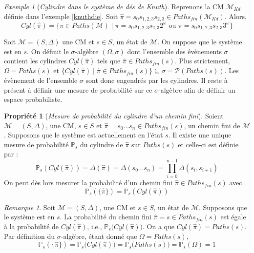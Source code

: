 \documentclass[12pt,a4paper]{report}
\theoremstyle{definition}%
\newtheorem{propriete}{Propriété}[chapter]
\theoremstyle{remark}
\newtheorem{example}{Exemple}[chapter]
\newtheorem{remark}{Remarque}[chapter]
\newcommand{\ie}{i.e., }
\newcommand{\pr}{\mathbb{P}}
\begin{document}
\begin{example}[\textit{Cylindre dans le système de dés de Knuth}]
	Reprenons la CM $\mathcal{M}_{Kd}$ définie dans l'exemple \ref{knuthdie}. Soit $\hat{\pi} = s_0s_{1, 2, 3}s_{2, 3} \in Paths_{fin}(\mathcal{M}_{Kd})$. Alors, \[Cyl(\hat{\pi}) = \{ \pi \in Paths(\mathcal{M}) \; | \; \pi = s_0s_{1, 2, 3}s_{2, 3} 2^\omega \text{ ou } \pi = s_0s_{1, 2, 3}s_{2, 3} 3^\omega \} \]
\end{example}

Soit $\mathcal{M} = (S, \Delta)$ une CM et $s \in S$, un état de $\mathcal{M}$. On suppose que le système est en $s$. On définit le $\sigma$-algèbre $(\Omega, \sigma)$ dont l'ensemble des évènements $\sigma$ contient les cylindres $Cyl(\hat{\pi})$ tels que $\hat{\pi} \in Paths_{fin}(s)$. Plus strictement, $\Omega = Paths(s)$ et
$\{ Cyl(\hat{\pi}) \; | \; \hat{\pi} \in Paths_{fin}(s) \} \subseteq \sigma = \mathcal{P}(Paths(s))$.
Les évènement de l'ensemble $\sigma$ sont donc engendrés par les cylindres.
Il reste à présent à définir une mesure de probabilité sur ce $\sigma$-algèbre afin de définir un espace probabiliste.

\begin{propriete}[\textit{Mesure de probabilité du cylindre d'un chemin fini}]
	Soient $\mathcal{M} = (S, \Delta)$, une CM, $s \in S$ et $\hat{\pi} = s_0 \dots s_n \in Paths_{fin}(s)$, un chemin fini de $\mathcal{M}$. Supposons que le système est actuellement en l'état $s$. Il existe une unique mesure de probabilité $\pr_s$ du cylindre de $\hat{\pi}$ sur $Paths(s)$
	et celle-ci est définie par :
	\[\pr_{s}(Cyl(\hat{\pi})) = \Delta(\hat{\pi}) = \Delta(s_0 \dots s_n) = \prod_{i = 0}^{n - 1} \Delta(s_i, s_{i+1})\]
	On peut dès lors mesurer la probabilité d'un chemin fini $\hat{\pi} \in Paths_{fin}(s)$ avec
\[ \pr_s(\{\hat{\pi}\}) = \pr_s(Cyl(\hat{\pi})) \]
\end{propriete}

\begin{remark}
	Soit $\mathcal{M} = (S, \Delta)$, une CM et $s \in S$, un état de $\mathcal{M}$. Supposons que le système est en $s$. La probabilité du chemin fini $\hat{\pi} = s \in Paths_{fin}(s)$ est égale à la probabilité de $Cyl(\hat{\pi})$, \ie $\pr_s\big(Cyl(\hat{\pi})\big)$. On a que $Cyl(\hat{\pi}) = Paths(s)$. Par définition du $\sigma$-algèbre, étant donné que $\Omega = Paths(s)$, \[\pr_s(\{\hat{\pi}\}) = \pr_s\big(Cyl(\hat{\pi})\big) = \pr_s\big(Paths(s)\big) = \pr_s(\Omega) = 1\]
\end{remark}
\end{document}
